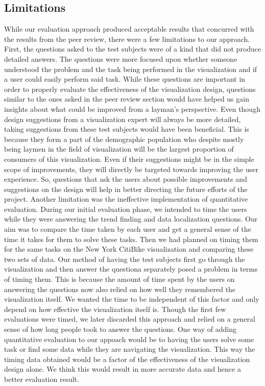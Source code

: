 \subsection{Limitations}
While our evaluation approach produced acceptable results that concurred with the results from the peer review, there were a few limitations to our approach. First, the questions asked to the test subjects were of a kind that did not produce detailed answers. The questions were more focused upon whether someone understood the problem and the task being performed in the visualization and if a user could easily perform said task. While these questions are important in order to properly evaluate the effectiveness of the visualization design, questions similar to the ones asked in the peer review section would have helped us gain insights about what could be improved from a layman's perspective. Even though design suggestions from a visualization expert will always be more detailed, taking suggestions from these test subjects would have been beneficial. This is because they form a part of the demographic population who despite mostly being laymen in the field of visualization will be the largest proportion of consumers of this visualization. Even if their suggestions might be in the simple scope of improvements, they will directly be targeted towards improving the user experience. So, questions that ask the users about possible improvements and suggestions on the design will help in better directing the future efforts of the project.\newline
Another limitation was the ineffective implementation of quantitative evaluation. During our initial evaluation phase, we intended to time the users while they were answering the trend finding and data localization questions. Our aim was to compare the time taken by each user and get a general sense of the time it takes for them to solve these tasks. Then we had planned on timing them for the same tasks on the New York CitiBike visualization and comparing these two sets of data. Our method of having the test subjects first go through the visualization and then answer the questiona separately posed a problem in terms of timing them. This is because the amount of time spent by the users on answering the questions now also relied on how well they remembered the visualization itself. We wanted the time to be independent of this factor and only depend on how effective the visualization itself is. Though the first few evaluations were timed, we later discarded this approach and relied on a general sense of how long people took to answer the questions.\newline
One way of adding quantitative evaluation to our appoach would be to having the users solve some task or find some data while they are navigating the visualization. This way the timing data obtained would be a factor of the effectiveness of the visualization design alone. We think this would result in more accurate data and hence a better evaluation result.